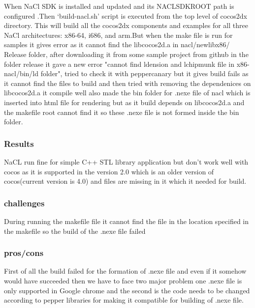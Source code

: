 \documentclass[23pt]{article}
\begin{document}
{\Large When NaCl SDK is installed and updated and its NACL\textunderscore SDK\textunderscore ROOT path is configured .Then ‘build-nacl.sh’ script is executed from the top level of cocos2dx directory. This will build all the cocos2dx components and examples for all three NaCl architectures: x86-64, i686, and arm.But when the make file is run for samples it gives error as it cannot find the libcocos2d.a in nacl/newlib\textunderscore x86/ Release folder, after downloading it from  some sample project from github in the folder release  it  gave a new  error "cannot find ldension  and lchipmunk file in  x86- nacl/bin/ld folder", tried to check it with pepper\textunderscore canary but it gives build fails as it cannot find the files to build and then tried with removing the dependenices on libcocos2d.a it compile well also made the bin folder for .nexe file of nacl which is inserted into html file for rendering but as it build depends on libcocos2d.a and the makefile root cannot find it so these .nexe file is not formed inside the bin folder. \cite{naclsetup} \par}

\subsubsection{Results}

{\Large NaCL run fine for simple C++ STL library application but don’t work well with cocos as it is supported in the version 2.0 which is an older version of cocos(current version is 4.0) and files are missing in it which it needed for build. \par}


\subsubsection{challenges}

{\Large During running the makefile file it cannot find the file in the location specified in the makefile so the build of the .nexe file failed \par}

\subsubsection{pros/cons}

{\Large First of all the build failed for the formation of .nexe file and even if it somehow would have succeeded then we have to face two major problem one .nexe file is only supported in Google chrome and the second is the code needs to be changed according to pepper libraries for making it compatible for building of .nexe file.}
\end{document}

